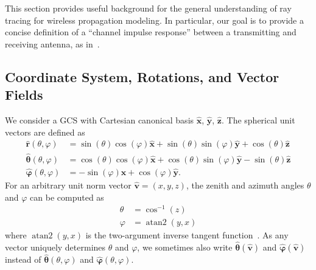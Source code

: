 This section provides useful background for the general understanding of ray tracing for wireless propagation modeling. In particular, our goal is to provide a concise definition of a ``channel impulse response'' between a transmitting and receiving antenna, as in~\cite[Ch. 2 \& 3]{geng2013planungsmethoden}.


\subsection{Coordinate System, Rotations, and Vector Fields}

We consider a \gls{GCS} with Cartesian canonical basis $\hat{\mathbf{x}}$, $\hat{\mathbf{y}}$, $\hat{\mathbf{z}}$.
The spherical unit vectors are defined as
\begin{equation}
    \begin{aligned}
        \label{eq:spherical_vecs}
        \hat{\mathbf{r}}          (\theta, \varphi) &= \sin(\theta)\cos(\varphi) \hat{\mathbf{x}} + \sin(\theta)\sin(\varphi) \hat{\mathbf{y}} + \cos(\theta)\hat{\mathbf{z}}\\
        \hat{\boldsymbol{\theta}} (\theta, \varphi) &= \cos(\theta)\cos(\varphi) \hat{\mathbf{x}} + \cos(\theta)\sin(\varphi) \hat{\mathbf{y}} - \sin(\theta)\hat{\mathbf{z}}\\
        \hat{\boldsymbol{\varphi}}(\theta, \varphi) &=            -\sin(\varphi) \hat{\mathbf{x}} +             \cos(\varphi) \hat{\mathbf{y}}.
    \end{aligned}
\end{equation}
%
For an arbitrary unit norm vector $\hat{\mathbf{v}} = (x, y, z)$, the zenith and azimuth angles $\theta$ and $\varphi$ can be computed as
\begin{equation}
    \begin{aligned}
        \theta  &= \cos^{-1}(z) \\
        \varphi &= \mathop{\text{atan2}}(y, x)
    \end{aligned}
\end{equation}
where $\mathop{\text{atan2}}(y, x)$ is the two-argument inverse tangent function~\cite{atan2}. As any vector uniquely determines $\theta$ and $\varphi$, we sometimes also write $\hat{\boldsymbol{\theta}}(\hat{\mathbf{v}})$ and $\hat{\boldsymbol{\varphi}}(\hat{\mathbf{v}})$ instead of $\hat{\boldsymbol{\theta}} (\theta, \varphi)$ and $\hat{\boldsymbol{\varphi}}(\theta, \varphi)$.

